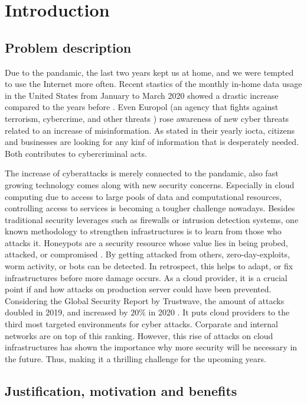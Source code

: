 \chapter{Introduction}

\section{Problem description}

Due to the pandamic, the last two years kept us at home, and we were tempted to use the Internet more often.
Recent stastics of the monthly in-home data usage in the United States from January to March 2020 showed a drastic increase compared to the years before \cite{statista2021}.
Even Europol (an agency that fights against terrorism, cybercrime, and other threats \cite{europol2021}) rose awareness of new cyber threats related to an increase of misinformation.
As stated in their yearly \ac{iocta}, citizens and businesses are looking for any kinf of information that is desperately needed.
Both contributes to cybercriminal acts. \cite{iocta2020}

The increase of cyberattacks is merely connected to the pandamic, also fast growing technology comes along with new security concerns.
Especially in cloud computing due to access to large pools of data and computational resources, controlling access to services is becoming a tougher challenge nowadays.
Besides traditional security leverages such as firewalls or intrusion detection systems, one known methodology to strengthen infrastructures is to learn from those who attacks it.
Honeypots are a security resource whose value lies in being probed, attacked, or compromised \cite{Spitzner2003}.
By getting attacked from others, zero-day-exploits, worm activity, or bots can be detected.
In retrospect, this helps to adapt, or fix infrastructures before more damage occurs.
As a cloud provider, it is a crucial point if and how attacks on production server could have been prevented.
Considering the Global Security Report by Trustwave, the amount of attacks doubled in 2019, and increased by $20\%$ in 2020 \cite{fahim2020}.
It puts cloud providers to the third most targeted environments for cyber attacks.
Corparate and internal networks are on top of this ranking.
However, this rise of attacks on cloud infrastructures has shown the importance why more security will be necessary in the future.
Thus, making it a thrilling challenge for the upcoming years.

\section{Justification, motivation and benefits}

